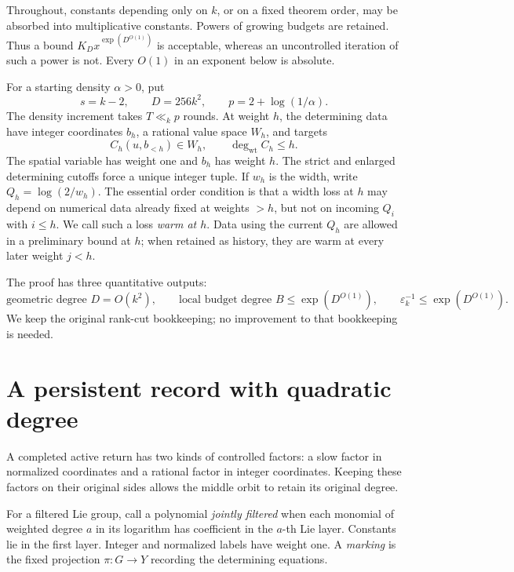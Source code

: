 \documentclass[11pt,a4paper]{article}
\theoremstyle{definition}
\newcommand{\wt}{\operatorname{wt}}
\begin{document}
Throughout, constants depending only on \(k\), or on a fixed theorem
order, may be absorbed into multiplicative constants. Powers of growing
budgets are retained. Thus a bound \(K_Dx^{\exp(D^{O(1)})}\) is acceptable,
whereas an uncontrolled iteration of such a power is not. Every
\(O(1)\) in an exponent below is absolute.

For a starting density \(\alpha>0\), put
\[
 s=k-2,\qquad D=256k^2,\qquad p=2+\log(1/\alpha).
\]
The density increment takes \(T\ll_k p\) rounds. At weight \(h\), the
determining data have integer coordinates \(b_h\), a rational value space
\(W_h\), and targets
\[
 C_h(u,b_{<h})\in W_h,\qquad \deg_{\wt} C_h\le h.
\]
The spatial variable has weight one and \(b_h\) has weight \(h\).
The strict and enlarged determining cutoffs force a unique integer tuple.
If \(w_h\) is the width, write \(Q_h=\log(2/w_h)\). The essential order
condition is that a width loss at \(h\) may depend on numerical data
already fixed at weights \(>h\), but not on incoming \(Q_i\) with
\(i\le h\). We call such a loss \emph{warm at \(h\)}. Data using the
current \(Q_h\) are allowed in a preliminary bound at \(h\); when
retained as history, they are warm at every later weight \(j<h\).

The proof has three quantitative outputs:
\[
 \text{geometric degree }D=O(k^2),\qquad
 \text{local budget degree }B\le\exp(D^{O(1)}),\qquad
 \varepsilon_k^{-1}\le\exp(D^{O(1)}).
\]
We keep the original rank-cut bookkeeping; no improvement to that
bookkeeping is needed.

\section{A persistent record with quadratic degree}\label{sec:macro}

A completed active return has two kinds of controlled factors: a slow
factor in normalized coordinates and a rational factor in integer
coordinates. Keeping these factors on their original sides allows the
middle orbit to retain its original degree.

For a filtered Lie group, call a polynomial \emph{jointly filtered} when
each monomial of weighted degree \(a\) in its logarithm has coefficient
in the \(a\)-th Lie layer. Constants lie in the first layer. Integer
and normalized labels have weight one. A \emph{marking} is the fixed
projection \(\pi:G\to Y\) recording the determining equations.
\end{document}
